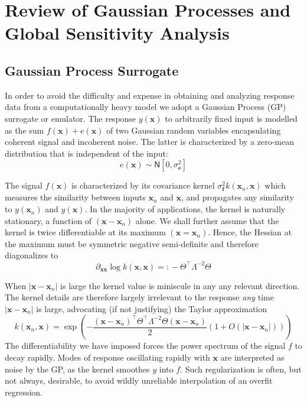 \documentclass[preprint,12pt]{elsarticle}
\newcommand*{\M}[1]{\ensuremath{#1}\xspace}
\newcommand*{\vr}[1]{\M{\mathbf{#1}}}
\newcommand*{\deqr}{\M{=\mathrel{\mathop:}}}
\newcommand*{\gauss}[2]{\mathsf{N}\!\left\lbrack{} #1 , #2 \right\rbrack}
\newcommand*{\modulus}[1]{\M{\left\lvert#1\right\rvert}}
\begin{document}
    \section{Review of Gaussian Processes and Global Sensitivity Analysis} \label{sec:TheoryReview}
        \subsection{Gaussian Process Surrogate}
            In order to avoid the difficulty and expense in obtaining and analyzing response data from a computationally heavy model we adopt a Gaussian Process (GP) surrogate or emulator. The response $y(\vr{x})$ to arbitrarily fixed input is modelled as the sum $f(\vr{x})+e(\vr{x})$ of two Gaussian random variables encapsulating coherent signal and incoherent noise. The latter is characterized by a zero-mean distribution that is independent of the input:
            \begin{equation*}
                e(\vr{x}) \sim \gauss{0}{\sigma^{2}_\vr{e}}
            \end{equation*}

            The signal $f(\vr{x})$ is characterized by its covariance kernel $\sigma^{2}_\vr{f} k(\vr{x}_{n},\vr{x})$ which measures the similarity between inputs $\vr{x}_{n}$ and $\vr{x}$, and propagates any similarity to $y(\vr{x}_{n})$ and $y(\vr{x})$. In the majority of applications, the kernel is naturally stationary, a function of $(\vr{x}-\vr{x}_{n})$ alone. We shall further assume that the kernel is twice differentiable at its maximum $(\vr{x}=\vr{x}_{n})$. Hence, the Hessian at the maximum must be symmetric negative semi-definite and therefore diagonalizes to
            \begin{equation*}
                \partial_{\vr{x}\vr{x}} \log k(\vr{x},\vr{x}) \deqr -\Theta^{\intercal}\Lambda^{-2}\Theta
            \end{equation*}

            When $\modulus{\vr{x}-\vr{x}_{n}}$ is large the kernel value is miniscule in any any relevant direction. The kernel details are therefore largely irrelevant to the response \emph{any} time $\modulus{\vr{x}-\vr{x}_{n}}$ is large, advocating (if not justifying) the Taylor approximation
            \begin{equation*}
                k(\vr{x}_{n},\vr{x}) = 
                \exp \left(-\frac
                    {(\vr{x}-\vr{x}_{n})^{\intercal} \Theta^{\intercal}\Lambda^{-2}\Theta (\vr{x}-\vr{x}_{n})}{2}
                    \left(1+O(\modulus{\vr{x}-\vr{x}_{n}})\right)
                \right)             
            \end{equation*}
            The differentiability we have imposed forces the power spectrum of the signal $f$ to decay rapidly. 
            Modes of response oscillating rapidly with $\vr{x}$ are interpreted as noise by the GP, as the kernel smoothes $y$ into $f$. Such regularization is often, but not always, desirable, to avoid wildly unreliable interpolation of an overfit regression.
\end{document}
